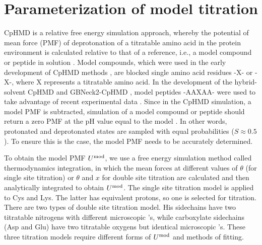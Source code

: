 \section{Parameterization of model titration} 
CpHMD is a relative free energy simulation approach, whereby the potential of mean force (PMF) of deprotonation of
a titratable amino acid in the protein environment is calculated relative to that of a reference, i.e., a model compound or peptide in solution
\cite{Lee_Brooks_2004_Proteins,Khandogin_Brooks_2005_Biophys.J.}. 
Model compounds, which were used in the early development of CpHMD methods
\cite{Lee_Brooks_2004_Proteins,Khandogin_Brooks_2005_Biophys.J.,Huang_Shen_2016_J.Chem.TheoryComput.},
are blocked single amino acid residues -X- or -X-,
where X represents a titratable amino acid.
In the development of the hybrid-solvent CpHMD \cite{Wallace_Shen_2011_J.Chem.TheoryComput.} and GBNeck2-CpHMD \cite{Huang_Shen_2018_J.Chem.Inf.Model.,Harris_Shen_2019_J.Chem.Inf.Model.}, 
model peptides 
-AAXAA- were used to take advantage of recent experimental data \cite{Thurlkill_Pace_2006_ProteinSci.,Platzer_McIntosh_2014_J.Biomol.NMR}.
Since in the CpHMD simulation, a model PMF is subtracted,
simulation of a model compound or peptide should return a zero PMF at the pH value equal to the model {\pka}.
In other words, protonated and deprotonated states are sampled with equal probabilities ($S\approx0.5$).
To ensure this is the case, the model PMF needs to be accurately determined.

To obtain the model PMF $U^{\rm mod}$, we use a free energy 
simulation method called thermodynamics integration,
in which the mean forces at different values of $\theta$ (for single site titration)
or $\theta$ and $x$ for double site titration
are calculated and then analytically
integrated to obtain $U^{\rm mod}$.
The single site titration model is applied
to Cys and Lys. The latter has equivalent protons, so one is selected for titration.
There are two types of double site titration model. His sidechains have two titratable nitrogens with different microscopic {\pka's}, while
carboxylate sidechains (Asp and Glu) have two titratable oxygens but identical microscopic {\pka's}.
These three titration models require
different forms of $U^{\rm mod}$ and methods of fitting.

